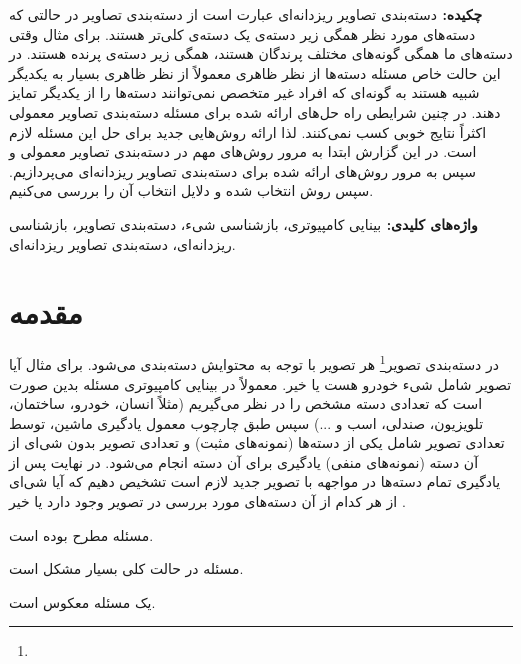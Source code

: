 \documentclass[11pt]{article}
\begin{document}



{\bf {چکيده: }}
دسته‌بندی تصاویر ریزدانه‌ای عبارت است از دسته‌بندی تصاویر در حالتی که دسته‌های مورد نظر همگی زیر دسته‌ی یک دسته‌ی کلی‌تر هستند. برای مثال وقتی دسته‌های ما همگی گونه‌های مختلف پرندگان هستند، همگی زیر دسته‌ی پرنده هستند. در این حالت خاص مسئله دسته‌ها از نظر ظاهری معمولاً از نظر ظاهری بسیار به یکدیگر شبیه هستند به گونه‌ای که افراد غیر متخصص نمی‌توانند دسته‌ها را از یکدیگر تمایز دهند. در چنین شرایطی راه حل‌های ارائه شده برای مسئله دسته‌بندی تصاویر معمولی اکثراً نتایج خوبی کسب نمی‌کنند. لذا ارائه روش‌هایی جدید برای حل این مسئله لازم است.
در این گزارش ابتدا به مرور روش‌های مهم در دسته‌بندی تصاویر معمولی و سپس به مرور روش‌های ارائه شده برای دسته‌بندی تصاویر ریزدانه‌ای می‌پردازیم. سپس روش انتخاب شده و دلایل انتخاب آن را بررسی می‌کنیم.


{\bf  { واژه‌های کلیدی: }}
بینایی کامپیوتری، بازشناسی شیء، دسته‌بندی تصاویر، بازشناسی ریزدانه‌ای، دسته‌بندی تصاویر ریزدانه‌ای.

\setlength{\parindent}{0.25in} %

\section{مقدمه}\label{intro}
در دسته‌بندی تصویر\footnote{} هر تصویر با توجه به محتوایش دسته‌بندی می‌شود. برای مثال آیا تصویر شامل شی‌ء خودرو هست یا خیر. معمولاً در بینایی کامپیوتری مسئله بدین صورت است که تعدادی دسته مشخص را در نظر می‌گیریم (مثلاً انسان، خودرو، ساختمان، تلویزیون، صندلی، اسب و ...) سپس طبق چارچوب معمول یادگیری ماشین، توسط تعدادی تصویر شامل یکی از دسته‌ها (نمونه‌های مثبت) و تعدادی تصویر بدون شی‌ای از آن دسته (نمونه‌های منفی) یادگیری برای آن دسته انجام می‌شود. در نهایت پس از یادگیری تمام دسته‌ها در مواجهه با تصویر جدید لازم است تشخیص دهیم که آیا شی‌ای از هر کدام از آن دسته‌های مورد بررسی در تصویر وجود دارد یا خیر
\cite{caltech101}.



مسئله مطرح بوده است.

مسئله در حالت کلی بسیار مشکل است.


یک مسئله معکوس است. 
\end{document}
